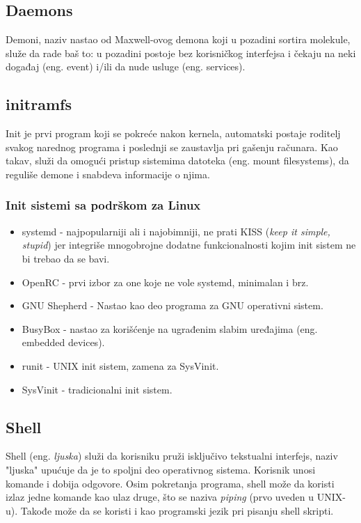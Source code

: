 \documentclass[a4paper,14pt]{article}
\begin{document}
\subsection{Daemons}
Demoni\cite{daemon}, naziv nastao od Maxwell-ovog demona koji u pozadini sortira molekule, služe da rade baš to: u pozadini postoje bez korisničkog interfejsa i čekaju na neki događaj (eng. event) i/ili da nude usluge (eng. services).

\subsection{initramfs}
Init je prvi program koji se pokreće nakon kernela, automatski postaje roditelj svakog narednog programa i poslednji se zaustavlja pri gašenju računara. Kao takav, služi da omogući pristup sistemima datoteka (eng. mount filesystems), da reguliše demone i snabdeva informacije o njima.
\subsubsection{Init sistemi sa podrškom za Linux}
\begin{itemize}
\item systemd - najpopularniji ali i najobimniji, ne prati KISS (\textit{keep it simple, stupid}) jer integriše mnogobrojne dodatne funkcionalnosti kojim init sistem ne bi trebao da se bavi.
\item OpenRC - prvi izbor za one koje ne vole systemd, minimalan i brz.
\item GNU Shepherd - Nastao kao deo programa za GNU operativni sistem.
\item BusyBox - nastao za korišćenje na ugrađenim slabim uređajima (eng. embedded devices).
\item runit - UNIX init sistem, zamena za SysVinit.
\item SysVinit - tradicionalni init sistem.
\end{itemize}
\newpage

\subsection{Shell}
Shell (eng. \textit{ljuska}) služi da korisniku pruži isključivo tekstualni interfejs, naziv "ljuska" upućuje da je to spoljni deo operativnog sistema. Korisnik unosi komande i dobija odgovore. Osim pokretanja programa, shell može da koristi izlaz jedne komande kao ulaz druge, što se naziva \textit{piping} (prvo uveden u UNIX-u). Takođe može da se koristi i kao programski jezik pri pisanju shell skripti.
\end{document}
